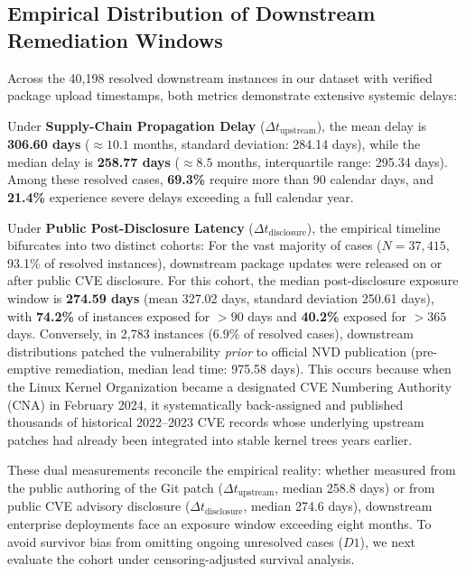 \documentclass[final,5p,times,twocolumn]{elsarticle}
\begin{document}
\subsection{Empirical Distribution of Downstream Remediation Windows}
Across the 40,198 resolved downstream instances in our dataset with verified package upload timestamps, both metrics demonstrate extensive systemic delays:

Under \textbf{Supply-Chain Propagation Delay} ($\Delta t_{\text{upstream}}$), the mean delay is \textbf{306.60 days} ($\approx 10.1$ months, standard deviation: 284.14 days), while the median delay is \textbf{258.77 days} ($\approx 8.5$ months, interquartile range: 295.34 days). Among these resolved cases, \textbf{69.3\%} require more than 90 calendar days, and \textbf{21.4\%} experience severe delays exceeding a full calendar year.

Under \textbf{Public Post-Disclosure Latency} ($\Delta t_{\text{disclosure}}$), the empirical timeline bifurcates into two distinct cohorts:
For the vast majority of cases ($N = 37,415$, 93.1\% of resolved instances), downstream package updates were released on or after public CVE disclosure. For this cohort, the median post-disclosure exposure window is \textbf{274.59 days} (mean 327.02 days, standard deviation 250.61 days), with \textbf{74.2\%} of instances exposed for $>90$ days and \textbf{40.2\%} exposed for $>365$ days.
Conversely, in 2,783 instances (6.9\% of resolved cases), downstream distributions patched the vulnerability \textit{prior} to official NVD publication (pre-emptive remediation, median lead time: 975.58 days). This occurs because when the Linux Kernel Organization became a designated CVE Numbering Authority (CNA) in February 2024, it systematically back-assigned and published thousands of historical 2022--2023 CVE records whose underlying upstream patches had already been integrated into stable kernel trees years earlier.

These dual measurements reconcile the empirical reality: whether measured from the public authoring of the Git patch ($\Delta t_{\text{upstream}}$, median 258.8 days) or from public CVE advisory disclosure ($\Delta t_{\text{disclosure}}$, median 274.6 days), downstream enterprise deployments face an exposure window exceeding eight months. To avoid survivor bias from omitting ongoing unresolved cases ($D1$), we next evaluate the cohort under censoring-adjusted survival analysis.
\end{document}
